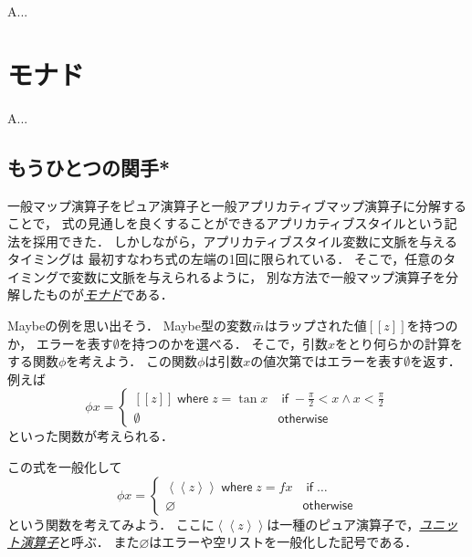 \documentclass[a4paper,draft]{jsbook}
\def\[{\left[\!\left[}
\def\]{\right]\!\right]}
\newenvironment{leader}{\begingroup}{\endgroup}
\newcommand{\keyword}[1]{{\underline{\emph{#1}}}}
\newcommand{\mathMaybeVar}[1]{\Tilde{#1}}
\newcommand{\mathMaybeWith}[1]{\[#1\]}
\newcommand{\mathUnitWith}[1]{\left\langle\!\left\langle#1\right\rangle\!\right\rangle}
\newcommand{\mathNothing}{\emptyset}
\newcommand{\mathPureNothing}{\varnothing}
\newcommand{\mathAnd}{\mathbin{\wedge}}
\newcommand{\mathKeyword}[1]{\operatorname{\textsf{#1}}}
\newcommand{\mathIf}{\mathKeyword{if}}
\newcommand{\mathOtherwise}{\mathKeyword{otherwise}}
\newcommand{\mathWhere}{\mathKeyword{where}}
\begin{document}
A...



\chapter{モナド}

\begin{leader}
A...
\end{leader}


\section{もうひとつの関手*}


一般マップ演算子をピュア演算子と一般アプリカティブマップ演算子に分解することで，
式の見通しを良くすることができるアプリカティブスタイルという記法を採用できた．
しかしながら，アプリカティブスタイル変数に文脈を与えるタイミングは
最初すなわち式の左端の1回に限られている．
そこで，任意のタイミングで変数に文脈を与えられるように，
別な方法で一般マップ演算子を分解したものが\keyword{モナド}である．

Maybeの例を思い出そう．
Maybe型の変数$\mathMaybeVar{m}$はラップされた値$\mathMaybeWith{z}$を持つのか，
エラーを表す$\mathNothing$を持つのかを選べる．
そこで，引数$x$をとり何らかの計算をする関数$\phi$を考えよう．
この関数$\phi$は引数$x$の値次第ではエラーを表す$\mathNothing$を返す．
例えば
\begin{equation}
\phi x=\begin{cases}
\mathMaybeWith{z}\mathWhere z=\tan x&\mathIf -\frac{\pi}{2}<x\mathAnd x<\frac{\pi}{2}\\
\mathNothing&\mathOtherwise
\end{cases}
\end{equation}
といった関数が考えられる．

この式を一般化して
\begin{equation}
\phi x=\begin{cases}
\mathUnitWith{z}\mathWhere z=fx&\mathIf\dots\\
\mathPureNothing&\mathOtherwise
\end{cases}
\end{equation}
という関数を考えてみよう．
ここに$\mathUnitWith{z}$は一種のピュア演算子で，\keyword{ユニット演算子}と呼ぶ．
また$\mathPureNothing$はエラーや空リストを一般化した記号である．
\end{document}

